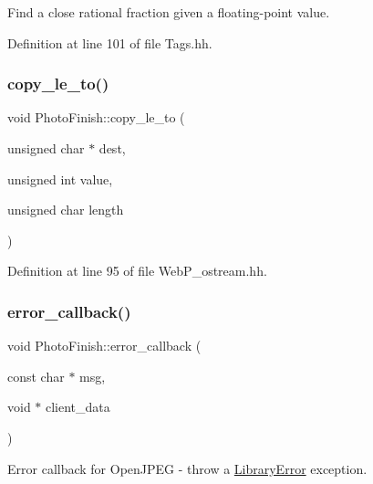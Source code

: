 Find a close rational fraction given a floating-\/point value. 



Definition at line 101 of file Tags.\+hh.

\mbox{\label{namespace_photo_finish_a768e4da23a5f8e540e63856631c5e036}} 
\subsubsection{\texorpdfstring{copy\+\_\+le\+\_\+to()}{copy\_le\_to()}}
{\footnotesize\ttfamily void Photo\+Finish\+::copy\+\_\+le\+\_\+to (\begin{DoxyParamCaption}\item[{unsigned char $\ast$}]{dest,  }\item[{unsigned int}]{value,  }\item[{unsigned char}]{length }\end{DoxyParamCaption})\hspace{0.3cm}{\ttfamily [inline]}}



Definition at line 95 of file Web\+P\+\_\+ostream.\+hh.

\mbox{\label{namespace_photo_finish_a8f2a0015f605e0f89ff8e2080e62abd6}} 
\subsubsection{\texorpdfstring{error\+\_\+callback()}{error\_callback()}}
{\footnotesize\ttfamily void Photo\+Finish\+::error\+\_\+callback (\begin{DoxyParamCaption}\item[{const char $\ast$}]{msg,  }\item[{void $\ast$}]{client\+\_\+data }\end{DoxyParamCaption})}



Error callback for Open\+J\+P\+EG -\/ throw a \hyperlink{class_photo_finish_1_1_library_error}{Library\+Error} exception. 




